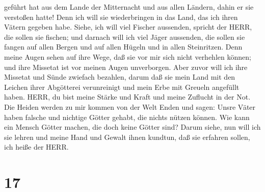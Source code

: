 geführt hat aus dem Lande der Mitternacht und aus allen Ländern, dahin
er sie verstoßen hatte! Denn ich will sie wiederbringen in das Land, das
ich ihren Vätern gegeben habe.  Siehe, ich will viel
Fischer aussenden, spricht der HERR, die sollen sie fischen; und darnach
will ich viel Jäger aussenden, die sollen sie fangen auf allen Bergen
und auf allen Hügeln und in allen Steinritzen.  Denn meine
Augen sehen auf ihre Wege, daß sie vor mir sich nicht verhehlen können;
und ihre Missetat ist vor meinen Augen unverborgen.  Aber
zuvor will ich ihre Missetat und Sünde zwiefach bezahlen, darum daß sie
mein Land mit den Leichen ihrer Abgötterei verunreinigt und mein Erbe
mit Greueln angefüllt haben.  HERR, du bist meine Stärke
und Kraft und meine Zuflucht in der Not. Die Heiden werden zu mir kommen
von der Welt Enden und sagen: Unsre Väter haben falsche und nichtige
Götter gehabt, die nichts nützen können.  Wie kann ein
Mensch Götter machen, die doch keine Götter sind?  Darum
siehe, nun will ich sie lehren und meine Hand und Gewalt ihnen kundtun,
daß sie erfahren sollen, ich heiße der HERR.

\hypertarget{section-16}{%
\section{17}\label{section-16}}

